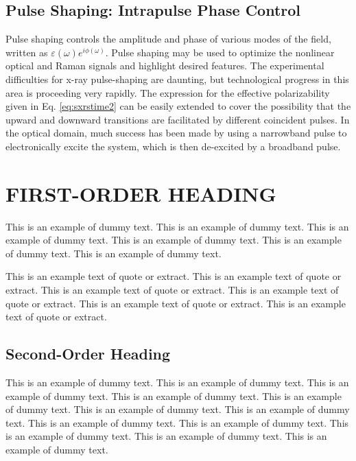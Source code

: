 \documentclass{ar-1col}
\begin{document}
\subsection{Pulse Shaping: Intrapulse Phase Control}
Pulse shaping controls the amplitude and
phase of various modes of the field, written as $\varepsilon(\omega) e^{i \phi(\omega)}.$  Pulse
shaping\cite{walmsley_characterization_2009}
may be used to optimize the nonlinear optical and Raman signals and
highlight desired features. The experimental difficulties
for x-ray pulse-shaping are daunting, but technological progress in
this area is proceeding very rapidly.  The
expression for the effective polarizability given in Eq. \ref{eq:sxrstime2}
 can be easily extended to cover the possibility that the
upward and downward transitions are facilitated by different coincident pulses.
In the optical domain,  much success has
been made by using a narrowband pulse to electronically excite the
system, which is then de-excited by a broadband pulse.%


\section{FIRST-ORDER HEADING}
This is an example of dummy text. This is an example of dummy text. This is an example of dummy text.
This is an example of dummy text. This is an example of dummy text. This is an example of dummy text.
\begin{extract}
This is an example text of quote or extract. This is an example text of quote or extract. 
This is an example text of quote or extract. This is an example text of quote or extract.
This is an example text of quote or extract. This is an example text of quote or extract.
\end{extract}


\subsection{Second-Order Heading}
This is an example of dummy text. This is an example of dummy text. This is an example of dummy text.
This is an example of dummy text. This is an example of dummy text. This is an example of dummy text.
This is an example of dummy text. This is an example of dummy text. This is an example of dummy text.
This is an example of dummy text. This is an example of dummy text. This is an example of dummy text.
\end{document}

